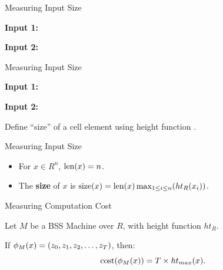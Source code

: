 \documentclass[c]{beamer}
\begin{document}
\begin{frame}{Measuring Input Size}

  \begin{center}
    \textbf{Input 1:}
  \end{center}

  \begin{center}
    \textbf{Input 2:}
  \end{center}

\end{frame}

\begin{frame}{Measuring Input Size}

  \begin{center}
    \textbf{Input 1:}
  \end{center}

  \begin{center}
    \textbf{Input 2:}
  \end{center}\pause

  Define ``size'' of a cell element using height function
  .
  
\end{frame}

\begin{frame}{Measuring Input Size}
  
  \begin{itemize}
  \item[] For $x \in R^n$, $\text{len}(x) = n$.

    \vspace{\baselineskip}
    
  \item[] The \textbf{size} of $x$ is $\text{size}(x) = \text{len}(x)\max_{1 \leq i \leq n}(ht_R(x_i))$.
  \end{itemize}
  
\end{frame}

\begin{frame}{Measuring Computation Cost}
  
  Let $M$ be a BSS Machine over $R$, with height function $ht_R$.

  \vspace{\baselineskip}

  If $\phi_M(x) = (z_0, z_1, z_2, \ldots, z_T)$, then:
  $$\text{cost}(\phi_M(x)) = T\times ht_{max}(x).$$
  
\end{frame}
\end{document}
